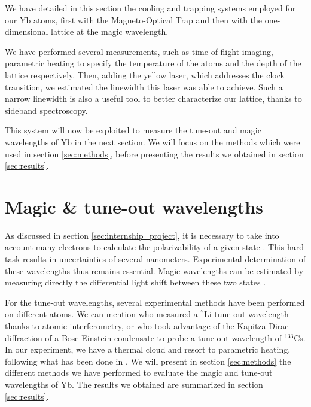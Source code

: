 \documentclass[11pt]{article}
\newenvironment{myblock}[1]{%
    \tcolorbox[%
    colback=color1,colframe=color1,%
    title=#1]}%
    {\endtcolorbox}
\numberwithin{equation}{section}
\numberwithin{figure}{section}
\begin{document}
\vspace{0.5cm}

\begin{myblock}{}
We have detailed in this section the cooling and trapping systems employed for our Yb atoms, first with the Magneto-Optical Trap and then with the one-dimensional lattice at the magic wavelength.

We have performed several measurements, such as time of flight imaging, parametric heating to specify the temperature of the atoms and the depth of the lattice respectively. Then, adding the yellow laser, which addresses the clock transition, we estimated the linewidth this laser was able to achieve. Such a narrow linewidth is also a useful tool to better characterize our lattice, thanks to sideband spectroscopy. 

This system will now be exploited to measure the tune-out and magic wavelengths of Yb in the next section. We will focus on the methods which were used in section \ref{sec:methods}, before presenting the results we obtained in section \ref{sec:results}.
\end{myblock}


\section{Magic \& tune-out wavelengths}
\label{sec:measurements}

As discussed in section \ref{sec:internship_project}, it is necessary to take into account many electrons to calculate the polarizability of a given state \citep{2010_dzuba}. This hard task results in uncertainties of several nanometers. Experimental determination of these wavelengths thus remains essential. Magic wavelengths can be estimated by measuring directly the differential light shift between these two states \citep{2008_barber}.

For the tune-out wavelengths, several experimental methods have been performed on different atoms. We can mention \cite{2021_ratkata} who measured a $^7$Li tune-out wavelength thanks to atomic interferometry, or \cite{2019_copenhaver} who took advantage of the Kapitza-Dirac diffraction of a Bose Einstein condensate to probe a tune-out wavelength of $^{133}$Cs. In our experiment, we have a thermal cloud and resort to parametric heating, following what has been done in \cite{2020_heinz}. We will present in section \ref{sec:methods} the different methods we have performed to evaluate the magic and tune-out wavelengths of Yb. The results we obtained are summarized in section \ref{sec:results}.
\end{document}
